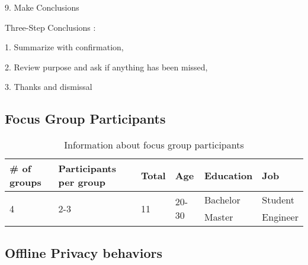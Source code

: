 9. Make Conclusions  

\begin{addmargin}[4em]{1em}
 
    Three-Step Conclusions :
    
    1. Summarize with confirmation, 
    
    2. Review purpose and ask if anything has been missed, 
    
    3. Thanks and dismissal    

\end{addmargin}

\subsection{Focus Group Participants}
\label{groupies}

\begin{table}[H]
    \centering
\begin{tabular}{ |p{2.5cm}|p{4.5cm}|p{1.5cm}|p{1cm}|p{2cm}|p{2cm}|  }
\hline
    \# of groups & Participants per group & Total & Age & Education & Job \\ 
\hline
\hline
    \multirow{2}{*}{4} & \multirow{2}{*}{2-3} & \multirow{2}{*}{11} & \multirow{2}{*}{20-30} & Bachelor & Student \\ \cline{5-6}
    & & & & Master & Engineer \\
\hline
\end{tabular}
\caption{Information about focus group participants}
    \label{tab:meng_t1}
\end{table}

\subsection{Offline Privacy behaviors}
\label{offline_behaviors}

